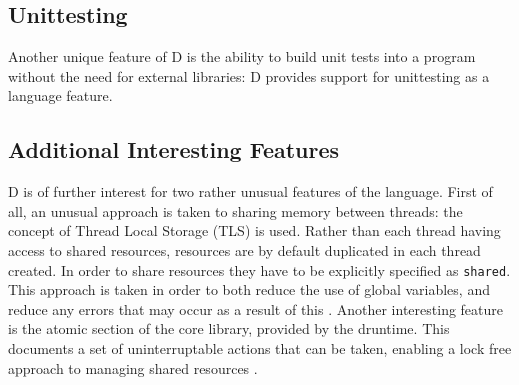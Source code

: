 \subsection{Unittesting}
Another unique feature of D is the ability to build unit tests into a 
program without the need for external libraries: D provides support for 
unittesting as a language feature. 

\subsection{Additional Interesting Features}

D is of further interest for two rather unusual features of the language.
First of all, an unusual approach is taken to sharing memory between threads: 
the concept of Thread Local Storage (TLS) is used. 
Rather than each thread having access to shared resources, resources are by 
default duplicated in each thread created. In order to share resources they 
have to be explicitly specified as \texttt{shared}. This approach is taken in 
order to both reduce the use of global variables, and reduce any errors that may
occur as a result of this \cite{dlang website for migrating to shared}.
Another interesting feature is the atomic section of the core library, provided 
by the druntime. This documents a set of uninterruptable actions that can be taken, 
enabling a lock free approach to managing shared resources \cite{shared documentation}.

